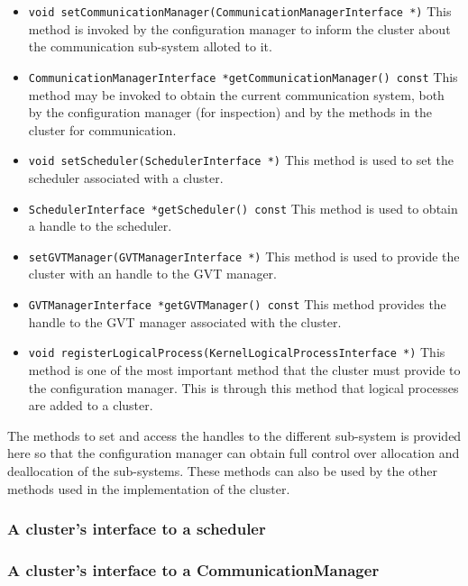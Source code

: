 \begin{itemize}
\item {\tt void setCommunicationManager(CommunicationManagerInterface *)}
  This method is invoked by the configuration manager to inform the
  cluster about the communication sub-system alloted to it.

\item {\tt CommunicationManagerInterface *getCommunicationManager() const}
  This method may be invoked to obtain the current communication system,
  both by the configuration manager (for inspection) and by the methods in
  the cluster for communication.

\item {\tt void setScheduler(SchedulerInterface *)} This method is used to
  set the scheduler associated with a cluster.

\item {\tt SchedulerInterface *getScheduler() const} This method is used
  to obtain a handle to the scheduler.

\item {\tt setGVTManager(GVTManagerInterface *)} This method is used to
  provide the cluster with an handle to the GVT manager.

\item {\tt GVTManagerInterface *getGVTManager() const} This method
  provides the handle to the GVT manager associated with the cluster.

\item {\tt void registerLogicalProcess(KernelLogicalProcessInterface *)}
  This method is one of the most important method that the cluster must
  provide to the configuration manager. This is through this method that
  logical processes are added to a cluster.
\end{itemize}

The methods to set and access the handles to the different sub-system is
provided here so that the configuration manager can obtain full control
over allocation and deallocation of the sub-systems. These methods can
also be used by the other methods used in the implementation of the
cluster.

\subsubsection{A cluster's interface to a scheduler}


\subsubsection{A cluster's interface to a CommunicationManager}

